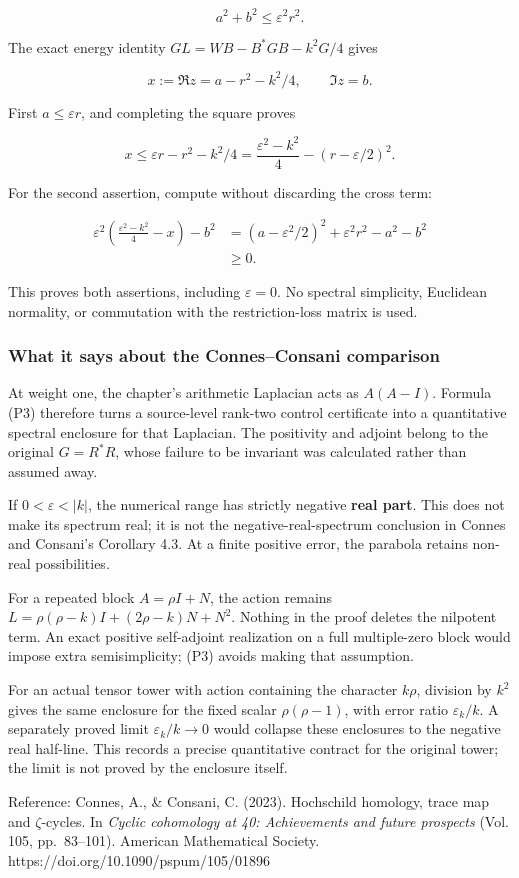 \[
a^2+b^2\le\varepsilon^2r^2.
\tag{P5}
\]

The exact energy identity \(GL=WB-B^*GB-k^2G/4\) gives

\[
x:=\Re z=a-r^2-k^2/4,\qquad\Im z=b.
\tag{P6}
\]

First \(a\le\varepsilon r\), and completing the square proves

\[
x\le\varepsilon r-r^2-k^2/4
=\frac{\varepsilon^2-k^2}{4}-(r-\varepsilon/2)^2.
\tag{P7}
\]

For the second assertion, compute without discarding the cross term:

\[
\begin{aligned}
\varepsilon^2\left(\frac{\varepsilon^2-k^2}{4}-x\right)-b^2
&=(a-\varepsilon^2/2)^2+\varepsilon^2r^2-a^2-b^2\\
&\ge0.
\end{aligned}
\tag{P8}
\]

This proves both assertions, including \(\varepsilon=0\). No spectral simplicity, Euclidean normality, or commutation with the restriction-loss matrix is used.

\subsubsection{What it says about the Connes--Consani comparison}\label{endpoint-cc_laplacian--what-it-says-about-the-connesconsani-comparison}

At weight one, the chapter's arithmetic Laplacian acts as \(A(A-I)\). Formula (P3) therefore turns a source-level rank-two control certificate into a quantitative spectral enclosure for that Laplacian. The positivity and adjoint belong to the original \(G=R^*R\), whose failure to be invariant was calculated rather than assumed away.

If \(0<\varepsilon<|k|\), the numerical range has strictly negative \textbf{real part}. This does not make its spectrum real; it is not the negative-real-spectrum conclusion in Connes and Consani's Corollary 4.3. At a finite positive error, the parabola retains non-real possibilities.

For a repeated block \(A=\rho I+N\), the action remains \(L=\rho(\rho-k)I+(2\rho-k)N+N^2\). Nothing in the proof deletes the nilpotent term. An exact positive self-adjoint realization on a full multiple-zero block would impose extra semisimplicity; (P3) avoids making that assumption.

For an actual tensor tower with action containing the character \(k\rho\), division by \(k^2\) gives the same enclosure for the fixed scalar \(\rho(\rho-1)\), with error ratio \(\varepsilon_k/k\). A separately proved limit \(\varepsilon_k/k\to0\) would collapse these enclosures to the negative real half-line. This records a precise quantitative contract for the original tower; the limit is not proved by the enclosure itself.

Reference: Connes, A., \& Consani, C. (2023). Hochschild homology, trace map and \(\zeta\)-cycles. In \emph{Cyclic cohomology at 40: Achievements and future prospects} (Vol. 105, pp.~83--101). American Mathematical Society. https://doi.org/10.1090/pspum/105/01896
